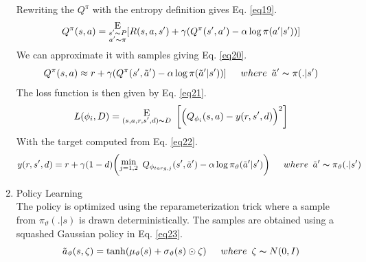 \begin{enumerate}[label={\alph*)}]
    Rewriting the $Q^\pi$ with the entropy definition gives Eq. \ref{eq19}.
    \begin{equation}
        Q^\pi(s, a) = \substack{\mathlarger{\text{E}} \\ s' \thicksim P\\ a' \thicksim \pi}[R(s, a, s') + \gamma (Q^\pi(s', a') - \alpha \log \pi(a'|s'))]
        \label{eq19}
    \end{equation}
    We can approximate it with samples giving Eq. \ref{eq20}.
    \begin{equation}
        Q^\pi(s, a) \approx r + \gamma (Q^\pi(s', \Tilde{a}') - \alpha \log\pi(\Tilde{a}'|s'))]\hspace{15pt} where \hspace{5pt} \Tilde{a}' \thicksim \pi(.|s')
        \label{eq20}
    \end{equation}
    The loss function is then given by Eq. \ref{eq21}.
    \begin{equation}
        L(\phi_{i}, D) = \substack{ \mathlarger{\mathlarger{\text{E}}}  \\ (s,a,r,s',d) \thicksim D}\hspace{5pt} \bigg[\Big(Q_{\phi_{i}} (s, a) - y(r, s', d) \Big)^2 \bigg]
        \label{eq21}
    \end{equation}
    With the target computed from Eq. \ref{eq22}.
    \begin{equation}
        y(r, s', d) = r + \gamma(1 - d) \bigg(\substack{\mathlarger{\text{min}} \\ j = 1,2}\hspace{5pt} Q_{\phi_{targ,j}}(s', \Tilde{a}') - \alpha \log \pi_{\vartheta}(\Tilde{a}' | s') \bigg) \hspace{15pt} where \hspace{5pt} \Tilde{a}' \thicksim \pi_{\vartheta}(.|s')
        \label{eq22}
    \end{equation}
    \item Policy Learning\\
    The policy is optimized using the reparameterization trick where a sample from $\pi_{\vartheta}(.|s)$ is drawn deterministically. The samples are obtained using a squashed Gaussian policy in Eq. \ref{eq23}.
    \begin{equation}
        \Tilde{a}_{\vartheta} (s, \zeta) = \tanh(\mu_{\vartheta}(s) + \sigma_{\vartheta}(s) \odot \zeta) \hspace{15pt} where \hspace{5pt} \zeta \thicksim N(0, I)
        \label{eq23}

\end{equation}
\end{enumerate}
